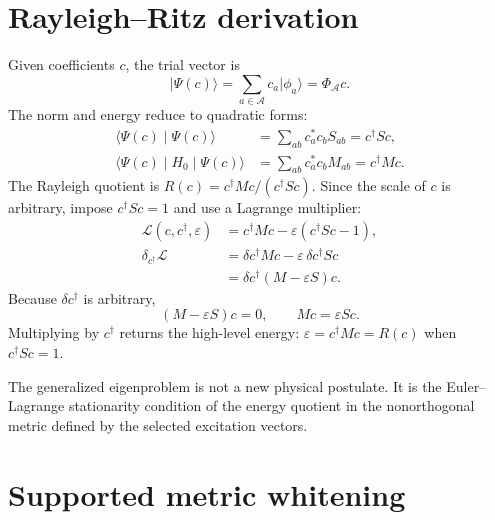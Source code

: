 \documentclass[10pt,twocolumn]{article}
\newcommand{\Acal}{\mathcal A}
\newcommand{\ket}[1]{\lvert #1\rangle}
\newcommand{\braket}[2]{\langle #1\mid #2\rangle}
\newcommand{\matel}[3]{\langle #1\mid #2\mid #3\rangle}
\begin{document}
\section{Rayleigh--Ritz derivation}

Given coefficients \(c\), the trial vector is
\begin{equation}
\ket{\Psi(c)}=\sum_{a\in\Acal}c_a\ket{\phi_a}=\Phi_\Acal c.
\label{eq:qse_trial}
\end{equation}
The norm and energy reduce to quadratic forms:
\begin{equation}
\begin{aligned}
\braket{\Psi(c)}{\Psi(c)}
&=\sum_{ab}c_a^*c_bS_{ab}=c^\dagger Sc,\\
\matel{\Psi(c)}{H_0}{\Psi(c)}
&=\sum_{ab}c_a^*c_bM_{ab}=c^\dagger Mc.
\end{aligned}
\label{eq:norm_energy}
\end{equation}
The Rayleigh quotient is \(R(c)=c^\dagger Mc/(c^\dagger Sc)\). Since the scale of \(c\) is arbitrary, impose \(c^\dagger Sc=1\) and use a Lagrange multiplier:
\begin{equation}
\begin{aligned}
\mathcal L(c,c^\dagger,\varepsilon)
&=c^\dagger Mc-\varepsilon(c^\dagger Sc-1),\\
\delta_{c^\dagger}\mathcal L
&=\delta c^\dagger Mc-\varepsilon\,\delta c^\dagger Sc\\
&=\delta c^\dagger(M-\varepsilon S)c.
\end{aligned}
\label{eq:lagrange_qse}
\end{equation}
Because \(\delta c^\dagger\) is arbitrary,
\begin{equation}
(M-\varepsilon S)c=0,
\qquad
Mc=\varepsilon Sc.
\label{eq:qse_gep}
\end{equation}
Multiplying by \(c^\dagger\) returns the high-level energy: \(\varepsilon=c^\dagger Mc=R(c)\) when \(c^\dagger Sc=1\).

\begin{jargonbox}
The generalized eigenproblem is not a new physical postulate. It is the Euler--Lagrange stationarity condition of the energy quotient in the nonorthogonal metric defined by the selected excitation vectors.
\end{jargonbox}

\section{Supported metric whitening}
\end{document}
